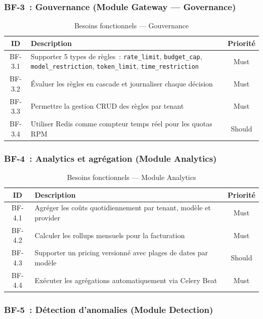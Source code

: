 \subsubsection{BF-3~: Gouvernance (Module Gateway --- Governance)}

\begin{table}[H]
\centering
\caption{Besoins fonctionnels --- Gouvernance}
\label{tab:bf_gov}
\begin{tabularx}{\textwidth}{|c|X|c|}
\hline
\textbf{ID} & \textbf{Description} & \textbf{Priorité} \\
\hline
BF-3.1 & Supporter 5 types de règles~: \texttt{rate\_limit}, \texttt{budget\_cap}, \texttt{model\_restriction}, \texttt{token\_limit}, \texttt{time\_restriction} & Must \\
\hline
BF-3.2 & Évaluer les règles en cascade et journaliser chaque décision & Must \\
\hline
BF-3.3 & Permettre la gestion CRUD des règles par tenant & Must \\
\hline
BF-3.4 & Utiliser Redis comme compteur temps réel pour les quotas RPM & Should \\
\hline
\end{tabularx}
\end{table}

\subsubsection{BF-4~: Analytics et agrégation (Module Analytics)}

\begin{table}[H]
\centering
\caption{Besoins fonctionnels --- Module Analytics}
\label{tab:bf_analytics}
\begin{tabularx}{\textwidth}{|c|X|c|}
\hline
\textbf{ID} & \textbf{Description} & \textbf{Priorité} \\
\hline
BF-4.1 & Agréger les coûts quotidiennement par tenant, modèle et provider & Must \\
\hline
BF-4.2 & Calculer les rollups mensuels pour la facturation & Must \\
\hline
BF-4.3 & Supporter un pricing versionné avec plages de dates par modèle & Should \\
\hline
BF-4.4 & Exécuter les agrégations automatiquement via Celery Beat & Must \\
\hline
\end{tabularx}
\end{table}

\subsubsection{BF-5~: Détection d'anomalies (Module Detection)}

